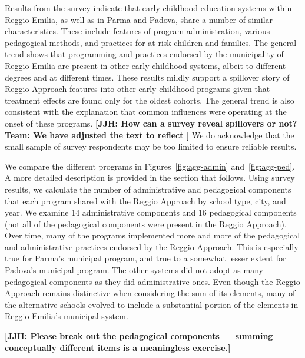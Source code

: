 Results from the survey indicate that early childhood education systems within Reggio Emilia, as well as in Parma and Padova, share a number of similar characteristics. These include features of program administration, various pedagogical methods, and practices for at-risk children and families. The general trend shows that programming and practices endorsed by the municipality of Reggio Emilia are present in other early childhood systems, albeit to different degrees and at different times. These results mildly support a spillover story of Reggio Approach features into other early childhood programs given that treatment effects are found only for the oldest cohorts. The general trend is also consistent with the explanation that common influences were operating at the onset of these programs. \textbf{[JJH: How can a survey reveal spillovers or not? Team: We have adjusted the text to reflect ]} We do acknowledge that the small sample of survey respondents may be too limited to ensure reliable results.

We compare the different programs in Figures~\ref{fig:agg-admin} and~\ref{fig:agg-ped}. A more detailed description is provided in the section that follows. Using survey results, we calculate the number of administrative and pedagogical components that each program shared with the Reggio Approach by school type, city, and year. We examine 14 administrative components and 16 pedagogical components (not all of the pedagogical components were present in the Reggio Approach). Over time, many of the programs implemented more and more of the pedagogical and administrative practices endorsed by the Reggio Approach. This is especially true for Parma's municipal program, and true to a somewhat lesser extent for Padova's municipal program. The other systems did not adopt as many pedagogical components as they did administrative ones. Even though the Reggio Approach remains distinctive when considering the sum of its elements, many of the alternative schools evolved to include a substantial portion of the elements in Reggio Emilia's municipal system.

\textbf{[JJH: Please break out the pedagogical components --- summing conceptually different items is a meaningless exercise.]}

